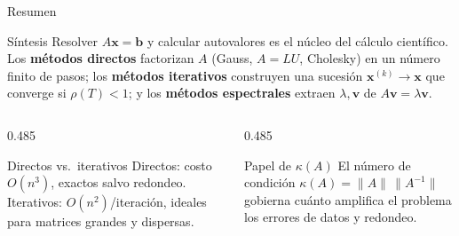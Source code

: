 \documentclass[aspectratio=169,10pt]{beamer}
\begin{document}
\begin{frame}{Resumen}
\begin{cardidea}{Síntesis}{\faLightbulb}
Resolver $A\mathbf{x}=\mathbf{b}$ y calcular autovalores es el núcleo del cálculo científico. Los \textbf{métodos directos} factorizan $A$ (Gauss, $A=LU$, Cholesky) en un número finito de pasos; los \textbf{métodos iterativos} construyen una sucesión $\mathbf{x}^{(k)}\!\to\!\mathbf{x}$ que converge si $\rho(T)<1$; y los \textbf{métodos espectrales} extraen $\lambda,\mathbf{v}$ de $A\mathbf{v}=\lambda\mathbf{v}$.
\end{cardidea}
\vspace{2mm}
\begin{columns}[T]
\begin{column}{0.485\textwidth}
\begin{cardgear}{Directos vs.\ iterativos}{\faCogs}
Directos: costo $O(n^3)$, exactos salvo redondeo. Iterativos: $O(n^2)$/iteración, ideales para matrices grandes y dispersas.
\end{cardgear}
\end{column}
\begin{column}{0.485\textwidth}
\begin{cardgear}{Papel de $\kappa(A)$}{\faCogs}
El número de condición $\kappa(A)=\|A\|\,\|A^{-1}\|$ gobierna cuánto amplifica el problema los errores de datos y redondeo.
\end{cardgear}
\end{column}
\end{columns}
\end{frame}
\end{document}
